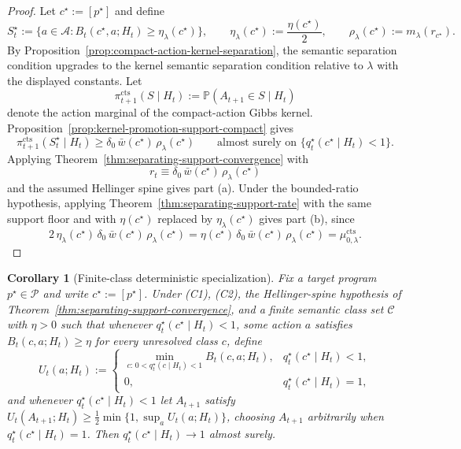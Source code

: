 \documentclass[11pt]{article}
\newtheorem{corollary}[theorem]{Corollary}
\theoremstyle{definition}
\theoremstyle{remark}
\newcommand{\Acal}{\mathcal{A}}
\newcommand{\Ccal}{\mathcal{C}}
\newcommand{\Pcal}{\mathcal{P}}
\newcommand{\Prob}{\mathbb{P}}
\begin{document}
\begin{proof}
Let $c^\star:=[p^\star]$ and define
\[
S_t^\star:=\{a\in\Acal:B_t(c^\star,a;H_t)\ge \eta_\lambda(c^\star)\},
\qquad
\eta_\lambda(c^\star):=\frac{\eta(c^\star)}{2},
\qquad
\rho_\lambda(c^\star):=m_\lambda(r_{c^\star}).
\]
By Proposition~\ref{prop:compact-action-kernel-separation}, the semantic separation condition upgrades to the kernel semantic separation condition relative to $\lambda$ with the displayed constants. Let
\[
\pi_{t+1}^{\mathrm{cts}}(S\mid H_t):=\Prob(A_{t+1}\in S\mid H_t)
\]
denote the action marginal of the compact-action Gibbs kernel. Proposition~\ref{prop:kernel-promotion-support-compact} gives
\[
\pi_{t+1}^{\mathrm{cts}}(S_t^\star\mid H_t)\ge \delta_0\,\bar w(c^\star)\,\rho_\lambda(c^\star)
\qquad\text{almost surely on }\{q_t^\star(c^\star\mid H_t)<1\}.
\]
Applying Theorem~\ref{thm:separating-support-convergence} with
\[
r_t\equiv \delta_0\,\bar w(c^\star)\,\rho_\lambda(c^\star)
\]
and the assumed Hellinger spine gives part \textup{(a)}. Under the bounded-ratio hypothesis, applying Theorem~\ref{thm:separating-support-rate} with the same support floor and with $\eta(c^\star)$ replaced by $\eta_\lambda(c^\star)$ gives part \textup{(b)}, since
\[
2\,\eta_\lambda(c^\star)\,\delta_0\,\bar w(c^\star)\,\rho_\lambda(c^\star)
=
\eta(c^\star)\,\delta_0\,\bar w(c^\star)\,\rho_\lambda(c^\star)
=
\mu_{0,\lambda}^{\mathrm{cts}}.
\]
\end{proof}

\begin{corollary}[Finite-class deterministic specialization]
\label{cor:finite-maximin}
Fix a target program $p^\star\in\Pcal$ and write $c^\star:=[p^\star]$. Under (C1), (C2), the Hellinger-spine hypothesis of Theorem~\ref{thm:separating-support-convergence}, and a finite semantic class set $\Ccal$ with $\eta>0$ such that whenever $q_t^\star(c^\star\mid H_t)<1$, some action $a$ satisfies $B_t(c,a;H_t)\ge\eta$ for every unresolved class $c$, define
\[
U_t(a;H_t):=
\begin{cases}
\min_{c:\,0<q_t^\star(c\mid H_t)<1}B_t(c,a;H_t), & q_t^\star(c^\star\mid H_t)<1,\\
0, & q_t^\star(c^\star\mid H_t)=1,
\end{cases}
\]
and whenever $q_t^\star(c^\star\mid H_t)<1$ let $A_{t+1}$ satisfy $U_t(A_{t+1};H_t)\ge\tfrac{1}{2}\min\{1,\sup_a U_t(a;H_t)\}$, choosing $A_{t+1}$ arbitrarily when $q_t^\star(c^\star\mid H_t)=1$. Then $q_t^\star(c^\star\mid H_t)\to 1$ almost surely.
\end{corollary}
\end{document}
